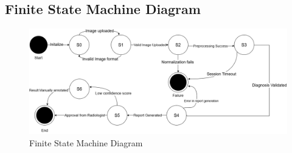\documentclass[12pt]{article}
\begin{document}
\subsection{Finite State Machine Diagram}
\begin{figure}[H]
    \centering
    \includegraphics[width=1\linewidth]{statem.png}
    \caption{Finite State Machine Diagram}
    \label{fig:enter-label}
\end{figure}

\newpage
\end{document}

